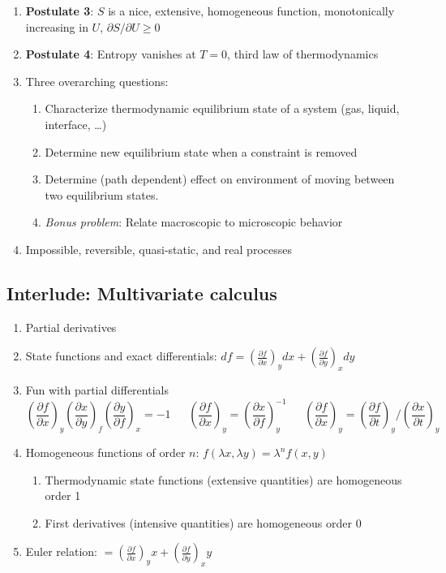 \documentclass[11pt]{article}
\begin{document}
\begin{enumerate}
\item \textbf{Postulate 3}: \(S\) is a nice, extensive, homogeneous function, monotonically increasing in \(U\), \(\partial S/\partial U \geq 0\)

\item \textbf{Postulate 4}: Entropy vanishes at \(T = 0\), third law of thermodynamics

\item Three overarching questions:
\begin{enumerate}
\item Characterize thermodynamic equilibrium state of a system (gas, liquid, interface, \ldots{})
\item Determine new equilibrium state when a constraint is removed
\item Determine (path dependent) effect on environment of moving between two equilibrium states.
\item \emph{Bonus problem}: Relate macroscopic to microscopic behavior
\end{enumerate}

\item Impossible, reversible, quasi-static, and real processes
\end{enumerate}

\subsection{Interlude: Multivariate calculus}
\label{sec:orgd6c129e}
\begin{enumerate}
\item Partial derivatives
\item State functions and exact differentials: \(df =\left (
       \frac{\partial f}{\partial x} \right )_y dx + \left (
       \frac{\partial f}{\partial y} \right )_x dy\)
\item Fun with partial differentials
\begin{equation*}
 \left ( \frac{\partial f}{\partial x} \right )_y    \left ( \frac{\partial
     x}{\partial y} \right )_f    \left ( \frac{\partial y}{\partial f} \right )_x =
 -1 \ \ \ \ \ \ \    \left ( \frac{\partial f}{\partial x} \right )_y  =   \left (
   \frac{\partial x}{\partial f} \right )_y^{-1}  \ \ \ \ \ \ \    \left (
   \frac{\partial f}{\partial x} \right )_y  =   \left ( \frac{\partial f}{\partial t}
 \right )_y  /   \left ( \frac{\partial x}{\partial t} \right )_y
\end{equation*}

\item Homogeneous functions of order \(n\): \(f(\lambda x, \lambda y ) = \lambda^n f(x,y)\)
\begin{enumerate}
\item Thermodynamic state functions (extensive quantities) are homogeneous order 1
\item First derivatives (intensive quantities) are homogeneous order 0
\end{enumerate}
\item Euler relation: \(=\left (
       \frac{\partial f}{\partial x} \right )_y x + \left (
       \frac{\partial f}{\partial y} \right )_x y\)
\end{enumerate}
\end{document}
